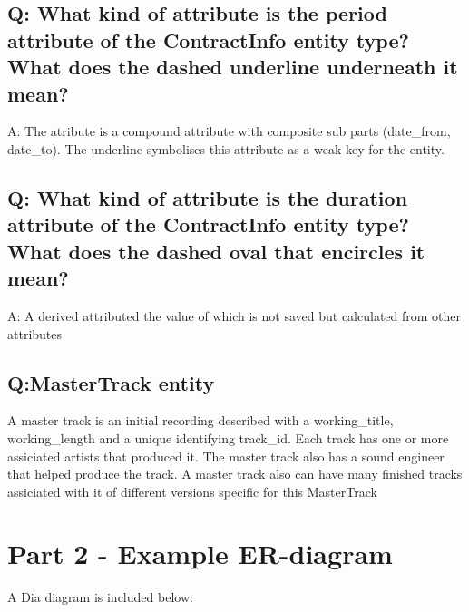 \documentclass[11pt,a4paper]{article}
\begin{document}
\subsection{Q: What kind of attribute is the period attribute of the ContractInfo entity 
type? What does the dashed underline underneath it mean?}

A: The atribute is a compound attribute with composite sub parts (date\_from,
 date\_to). The underline symbolises this attribute as a weak key for the 
entity. 


\subsection{Q: What kind of attribute is the duration attribute of the ContractInfo 
entity type? What does the dashed oval that encircles it mean?}

A: A derived attributed the value of which is not saved but calculated from
other attributes


\subsection{Q:MasterTrack entity}

A master track is an initial recording described with a working\_title,
 working\_length and a unique identifying track\_id.
Each track has one or more assiciated artists that produced it.
The master track also has a sound engineer that helped produce the track.
A master track also can have many finished tracks assiciated with it of
 different versions specific for this MasterTrack

\section{Part 2 - Example ER-diagram}

A Dia diagram is included below:
\end{document}
